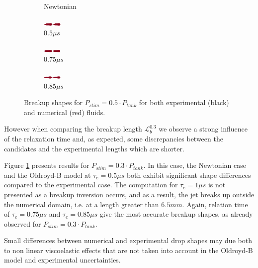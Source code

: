 \documentclass[twocolumn,10pt]{asme2ej}
\begin{document}
\begin{figure}[]
\begin{subfigure}[t]{1.7cm}
        \caption{Newtonian}
    \end{subfigure}
    \hfill
    \begin{subfigure}[t]{1.6cm}
        \centering
        \includegraphics[angle=-90,origin=c,width=0.9cm]{Encre/05_A5.png}
        \caption{$0.5\mu s$}
    \end{subfigure}\hfill
    \begin{subfigure}[t]{1.6cm}
        \centering
        \includegraphics[angle=-90,origin=c,width=0.9cm]{Encre/075_A5.png}
        \caption{$0.75\mu s$}
    \end{subfigure}
    \hfill
    \begin{subfigure}[t]{1.6cm}
        \centering
        \includegraphics[angle=-90,origin=c,width=0.9cm]{Encre/085_A5.png}
        \caption{$0.85\mu s$}
    \end{subfigure}
    \caption{Breakup shapes for $P_{stim}=0.5\cdot P_{tank}$ for both experimental (black) and numerical (red) fluids.}
    \label{fig:A5}
\end{figure}
However when comparing the breakup length $\mathcal{L}^{0.3}_b$ we observe a strong influence of the relaxation time and, as expected, some discrepancies between the candidates and the experimental lengths which are shorter.

Figure \ref{fig:A5} presents results for $P_{stim}=0.3\cdot P_{tank}$. In this case, the Newtonian case and the Oldroyd-B model at  $\tau_e = 0.5 \mu s$ both exhibit significant shape differences compared to the experimental case. The computation for  $\tau_e = 1 \mu s$ is not presented as a breakup inversion occurs, and as a result, the jet breaks up outside the numerical domain, i.e. at a length greater than $6.5mm$.
Again, relation time of  $\tau_e = 0.75 \mu s$ and  $\tau_e = 0.85 \mu s$ give the most accurate breakup shapes, as already observed for $P_{stim}=0.3\cdot P_{tank}$.


Small differences between numerical and experimental drop shapes may due both to non linear viscoelastic effects that are not taken into account in the Oldroyd-B model and experimental uncertainties.
\end{document}
